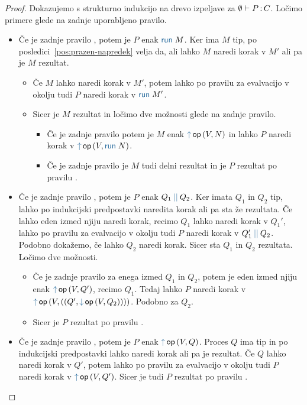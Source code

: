 \begin{proof}
	Dokazujemo s strukturno indukcijo na drevo izpeljave za $\emptyset \vdash P \mathinner{:} C$.
	Ločimo primere glede na zadnje uporabljeno pravilo.
	
	\begin{itemize}
		\item Če je zadnje pravilo , potem je $P$ enak $\tmrun{M}$.
		Ker ima $M$ tip, po posledici~\ref{pos:prazen-napredek} velja da, ali lahko $M$ naredi korak v $M'$ ali pa je $M$ rezultat.
		\begin{itemize}
			\item Če $M$ lahko naredi korak v $M'$, potem lahko po pravilu za evalvacijo v okolju tudi $P$ naredi korak v $\tmrun{M'}$.
			\item Sicer je $M$ rezultat in ločimo dve možnosti glede na zadnje pravilo.
			\begin{itemize}
				\item Če je zadnje pravilo  potem je $M$ enak $\tmopout{op}{V}{N}$ in lahko $P$ naredi korak v $\tmopout{op}{V}{\tmrun{N}}$.
				\item Če je zadnje pravilo  je $M$ tudi delni rezultat in je $P$ rezultat po pravilu .
			\end{itemize}
		\end{itemize}
		
		\item Če je zadnje pravilo , potem je $P$ enak $\tmpar{Q_1}{Q_2}$. Ker imata $Q_1$ in $Q_2$ tip, lahko po indukcijski predpostavki naredita korak ali pa sta že rezultata.
		Če lahko eden izmed njiju naredi korak, recimo $Q_1$ lahko naredi korak v $Q_1'$, lahko po pravilu za evalvacijo v okolju tudi $P$ naredi korak v $\tmpar{Q_1'}{Q_2}$. Podobno dokažemo, če lahko $Q_2$ naredi korak.
		Sicer sta $Q_1$ in $Q_2$ rezultata. Ločimo dve možnosti.
		\begin{itemize}
			\item Če je zadnje pravilo  za enega izmed $Q_1$ in $Q_2$, potem je eden izmed njiju enak $\tmopout{op}{V}{Q'}$, recimo $Q_1$. Tedaj lahko $P$ naredi korak v $\tmopout{op}{V}{(\tmpair{Q'}{\tmopin{op}{V}{Q_2}})}$. Podobno za $Q_2$.
			\item Sicer je $P$ rezultat po pravilu .
		\end{itemize}
		
		\item Če je zadnje pravilo , potem je $P$ enak $\tmopout{op}{V}{Q}$. Proces $Q$ ima tip in po indukcijski predpostavki lahko naredi korak ali pa je rezultat.
		Če $Q$ lahko naredi korak v $Q'$, potem lahko po pravilu za evalvacijo v okolju tudi $P$ naredi korak v $\tmopout{op}{V}{Q'}$.
		Sicer je tudi $P$ rezultat po pravilu .
		

\end{itemize}
\end{proof}
